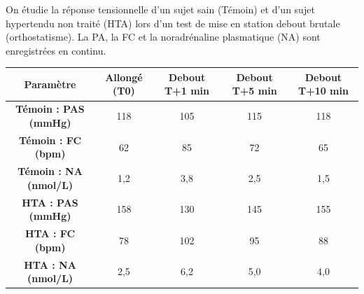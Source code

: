 \documentclass[11pt]{article}
\begin{document}
\begin{exercice}
On étudie la réponse tensionnelle d'un sujet sain (Témoin) et d'un sujet hypertendu non traité (HTA) lors d'un test de mise en station debout brutale (orthostatisme). La PA, la FC et la noradrénaline plasmatique (NA) sont enregistrées en continu.

\begin{center}
\begin{tabular}{|c|c|c|c|c|}
\hline
\textbf{Paramètre} & \textbf{Allongé (T0)} & \textbf{Debout T+1 min} & \textbf{Debout T+5 min} & \textbf{Debout T+10 min} \\
\hline
\textbf{Témoin : PAS (mmHg)} & 118 & 105 & 115 & 118 \\
\textbf{Témoin : FC (bpm)} & 62 & 85 & 72 & 65 \\
\textbf{Témoin : NA (nmol/L)} & 1,2 & 3,8 & 2,5 & 1,5 \\
\hline
\textbf{HTA : PAS (mmHg)} & 158 & 130 & 145 & 155 \\
\textbf{HTA : FC (bpm)} & 78 & 102 & 95 & 88 \\
\textbf{HTA : NA (nmol/L)} & 2,5 & 6,2 & 5,0 & 4,0 \\
\hline
\end{tabular}
\end{center}


\end{exercice}
\end{document}
